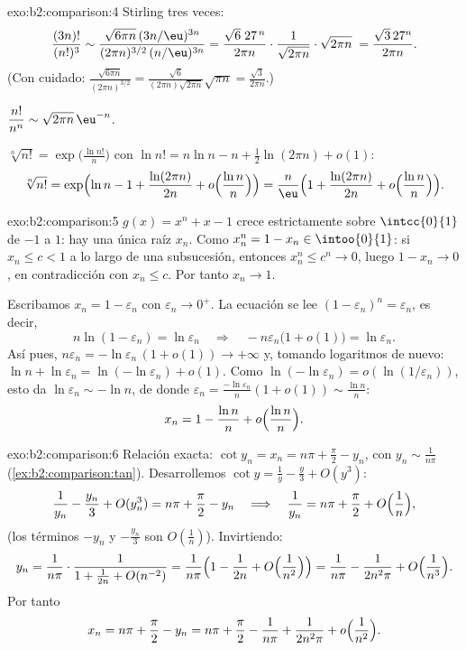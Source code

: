 \begin{solution}{exo:b2:comparison:4}
Stirling tres veces:
\[
\frac{(3n)!}{(n!)^3}
\sim \frac{\sqrt{6\pi n}\,(3n/\eu)^{3n}}
{(2\pi n)^{3/2}\,(n/\eu)^{3n}}
= \frac{\sqrt{6}\; 27^{\,n}}{2\pi n} \cdot
\frac{1}{\sqrt{2\pi n}}\cdot\sqrt{2\pi n}\;
= \frac{\sqrt3\,27^n}{2\pi n} .
\]
(Con cuidado: $\frac{\sqrt{6\pi n}}{(2\pi n)^{3/2}} =
\frac{\sqrt6}{(2\pi n)\sqrt{2\pi n}}\sqrt{\pi n} =
\frac{\sqrt3}{2\pi n}$.)

$\dfrac{n!}{n^n} \sim \sqrt{2\pi n}\,\eu^{-n}$.

$\sqrt[n]{n!} = \exp\bigl(\frac{\ln n!}{n}\bigr)$ con $\ln n! = n\ln
n - n + \frac12\ln(2\pi n) + o(1)$:
\[
\sqrt[n]{n!} = \exp\Bigl(\ln n - 1 + \frac{\ln(2\pi n)}{2n} +
o\Bigl(\frac{\ln n}{n}\Bigr)\Bigr)
= \frac{n}{\eu}\Bigl(1 + \frac{\ln(2\pi n)}{2n} +
o\Bigl(\frac{\ln n}{n}\Bigr)\Bigr).
\]
\end{solution}

\begin{solution}{exo:b2:comparison:5}
$g(x) = x^n + x - 1$ crece estrictamente sobre $\intcc{0}{1}$ de
$-1$ a $1$: hay una única raíz $x_n$. Como $x_n^n = 1 - x_n \in
\intoo{0}{1}$: si $x_n \leq c < 1$ a lo largo de una subsucesión,
entonces $x_n^n \leq c^n \to 0$, luego $1 - x_n \to 0$, en
contradicción con $x_n \leq c$. Por tanto $x_n \to 1$.

Escribamos $x_n = 1 - \varepsilon_n$ con $\varepsilon_n \to 0^+$. La
ecuación se lee $(1 - \varepsilon_n)^n = \varepsilon_n$, es decir,
\[
n\ln(1 - \varepsilon_n) = \ln \varepsilon_n
\quad\Longrightarrow\quad
-n\varepsilon_n\bigl(1 + o(1)\bigr) = \ln\varepsilon_n .
\]
Así pues, $n\varepsilon_n = -\ln\varepsilon_n\,(1 + o(1)) \to
+\infty$ y, tomando logaritmos de nuevo: $\ln n + \ln\varepsilon_n =
\ln(-\ln\varepsilon_n) + o(1)$. Como $\ln(-\ln \varepsilon_n) =
o(\ln(1/\varepsilon_n))$, esto da $\ln\varepsilon_n \sim -\ln n$, de
donde $\varepsilon_n = \frac{-\ln\varepsilon_n}{n}(1 + o(1)) \sim
\frac{\ln n}{n}$:
\[
x_n = 1 - \frac{\ln n}{n} + o\Bigl(\frac{\ln n}{n}\Bigr) .
\]
\end{solution}

\begin{solution}{exo:b2:comparison:6}
Relación exacta: $\cot y_n = x_n = n\pi + \frac\pi2 - y_n$, con $y_n
\sim \frac{1}{n\pi}$ (\cref{ex:b2:comparison:tan}). Desarrollemos
$\cot y = \frac1y - \frac y3 + O(y^3)$:
\[
\frac{1}{y_n} - \frac{y_n}{3} + O(y_n^3) = n\pi + \frac\pi2 - y_n
\quad\Longrightarrow\quad
\frac{1}{y_n} = n\pi + \frac\pi2 + O\Bigl(\frac1n\Bigr),
\]
(los términos $-y_n$ y $-\frac{y_n}{3}$ son $O(\frac1n)$).
Invirtiendo:
\[
y_n = \frac{1}{n\pi}\cdot\frac{1}{1 + \frac{1}{2n} + O(n^{-2})}
= \frac{1}{n\pi}\Bigl(1 - \frac{1}{2n} + O\Bigl(\frac{1}{n^2}\Bigr)\Bigr)
= \frac{1}{n\pi} - \frac{1}{2n^2\pi} + O\Bigl(\frac{1}{n^3}\Bigr).
\]
Por tanto
\[
x_n = n\pi + \frac{\pi}{2} - y_n
= n\pi + \frac\pi2 - \frac{1}{n\pi} + \frac{1}{2n^2\pi} +
o\Bigl(\frac{1}{n^2}\Bigr).
\]
\end{solution}

